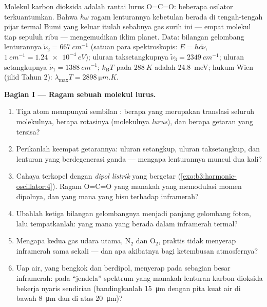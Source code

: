 \begin{problem}\label{pb:b3:harmonic-oscillator:1}
Molekul karbon dioksida adalah rantai lurus O=C=O: beberapa osilator
terkuantumkan. Bahwa $\hbar\omega$ ragam lenturannya kebetulan berada di
tengah-tengah pijar termal Bumi yang keluar itulah sebabnya gas surih
ini --- empat molekul tiap sepuluh ribu --- mengemudikan iklim planet.
Data: bilangan gelombang lenturannya $\tilde\nu_2 = \qty{667}{cm^{-1}}$
(satuan para spektroskopis: $E = hc\tilde\nu$, $\qty{1}{cm^{-1}} =
\qty{1.24e-4}{eV}$); uluran taksetangkupnya $\tilde\nu_3 =
\qty{2349}{cm^{-1}}$; uluran setangkupnya $\tilde\nu_1 =
\qty{1388}{cm^{-1}}$; $k_{\text{B}}T$ pada $\qty{288}{K}$ adalah
\qty{24.8}{meV}; hukum Wien (jilid Tahun 2): $\lambda_{\max}T =
\qty{2898}{\micro m.K}$.

\medskip\noindent\textbf{Bagian I --- Ragam sebuah molekul lurus.}
\begin{enumerate}
  \item Tiga atom mempunyai sembilan : berapa yang
        merupakan translasi seluruh molekulnya, berapa rotasinya
        (molekulnya \emph{lurus}), dan berapa getaran yang tersisa?
  \item Perikanlah keempat getarannya: uluran setangkup, uluran
        taksetangkup, dan lenturan yang berdegenerasi ganda --- mengapa
        lenturannya muncul dua kali?
  \item Cahaya terkopel dengan \emph{dipol listrik} yang bergetar
        (\cref{exo:b3:harmonic-oscillator:4}). Ragam O=C=O yang manakah
        yang memodulasi momen dipolnya, dan yang mana yang bisu terhadap
        inframerah?
  \item Ubahlah ketiga bilangan gelombangnya menjadi panjang gelombang
        foton, lalu tempatkanlah: yang mana yang berada dalam inframerah
        termal?
  \item Mengapa kedua gas udara utama, N$_2$ dan O$_2$, praktis tidak
        menyerap inframerah sama sekali --- dan apa akibatnya bagi
        ketembusan atmosfernya?
  \item Uap air, yang bengkok dan berdipol, menyerap pada sebagian besar
        inframerah: pada ``jendela'' spektrum yang manakah lenturan
        karbon dioksida bekerja nyaris sendirian (bandingkanlah
        \qty{15}{\micro m} dengan pita kuat air di bawah
        \qty{8}{\micro m} dan di atas \qty{20}{\micro m})?
\end{enumerate}


\end{problem}
